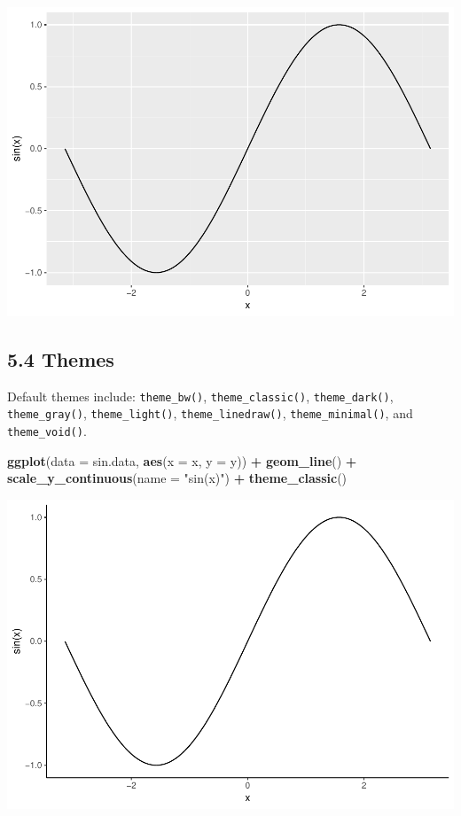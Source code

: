 \documentclass[]{article}
\newenvironment{Shaded}{\begin{snugshade}}{\end{snugshade}}
\newcommand{\KeywordTok}[1]{\textcolor[rgb]{0.13,0.29,0.53}{\textbf{#1}}}
\newcommand{\DataTypeTok}[1]{\textcolor[rgb]{0.13,0.29,0.53}{#1}}
\newcommand{\StringTok}[1]{\textcolor[rgb]{0.31,0.60,0.02}{#1}}
\newcommand{\OperatorTok}[1]{\textcolor[rgb]{0.81,0.36,0.00}{\textbf{#1}}}
\newcommand{\NormalTok}[1]{#1}
\begin{document}
\includegraphics{stt-301-programming_files/figure-latex/unnamed-chunk-74-1.pdf}

\subsection{5.4 Themes}\label{themes}

Default themes include: \texttt{theme\_bw()}, \texttt{theme\_classic()},
\texttt{theme\_dark()}, \texttt{theme\_gray()}, \texttt{theme\_light()},
\texttt{theme\_linedraw()}, \texttt{theme\_minimal()}, and
\texttt{theme\_void()}.

\begin{Shaded}
\begin{Highlighting}[]
\KeywordTok{ggplot}\NormalTok{(}\DataTypeTok{data =}\NormalTok{ sin.data, }\KeywordTok{aes}\NormalTok{(}\DataTypeTok{x =}\NormalTok{ x, }\DataTypeTok{y =}\NormalTok{ y)) }\OperatorTok{+}\StringTok{ }\KeywordTok{geom_line}\NormalTok{() }\OperatorTok{+}
\StringTok{  }\KeywordTok{scale_y_continuous}\NormalTok{(}\DataTypeTok{name =} \StringTok{"sin(x)"}\NormalTok{) }\OperatorTok{+}
\StringTok{  }\KeywordTok{theme_classic}\NormalTok{()}
\end{Highlighting}
\end{Shaded}

\includegraphics{stt-301-programming_files/figure-latex/unnamed-chunk-75-1.pdf}
\end{document}
